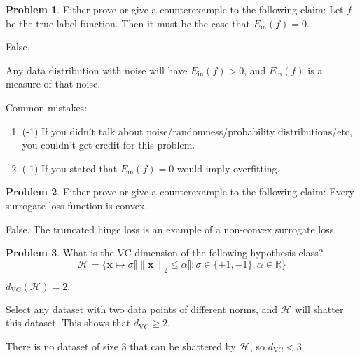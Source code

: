 \documentclass[10pt]{exam}
\theoremstyle{definition}
\newtheorem{problem}{Problem}
\newcommand{\R}{\mathbb R}
\newcommand{\x}{\mathbf x}
\newcommand{\ltwo}[1]{{\lVert {#1} \rVert}_2}
\newcommand{\Ein}{E_{\text{in}}}
\newcommand{\dvc}{{d_{\text{VC}}}}
\newcommand{\HH}[1]{\mathcal H_{\text{#1}}}
\begin{document}
\newpage
\begin{problem}
Either prove or give a counterexample to the following claim: 
Let $f$ be the true label function.
Then it must be the case that $\Ein(f)=0$.
\end{problem}
\begin{solution}
    False.

    Any data distribution with noise will have $\Ein(f)>0$,
    and $\Ein(f)$ is a measure of that noise.

    Common mistakes:
    \begin{enumerate}
    \item (-1) If you didn't talk about noise/randomness/probability distributions/etc, you couldn't get credit for this problem.
    \item (-1) If you stated that $\Ein(f)=0$ would imply overfitting.
    \end{enumerate}
\end{solution}

\newpage
\begin{problem}
Either prove or give a counterexample to the following claim: 
Every surrogate loss function is convex.
\end{problem}
\begin{solution}
    False.
    The truncated hinge loss is an example of a non-convex surrogate loss.
\end{solution}

\newpage
\begin{problem}
What is the VC dimension of the following hypothesis class?
\begin{equation}
    \HH{} = \bigg\{ \x \mapsto \sigma\big\llbracket \ltwo{\x} \le \alpha \big\rrbracket : \sigma\in\{+1,-1\}, \alpha \in \R \bigg\}
\end{equation}
\end{problem}
\begin{solution}
    $\dvc(\HH{})=2.$

    Select any dataset with two data points of different norms, and $\HH{}$ will shatter this dataset.
    This shows that $\dvc\ge2$.

    There is no dataset of size 3 that can be shattered by $\HH{}$,
    so $\dvc<3$.
\end{solution}
\end{document}
